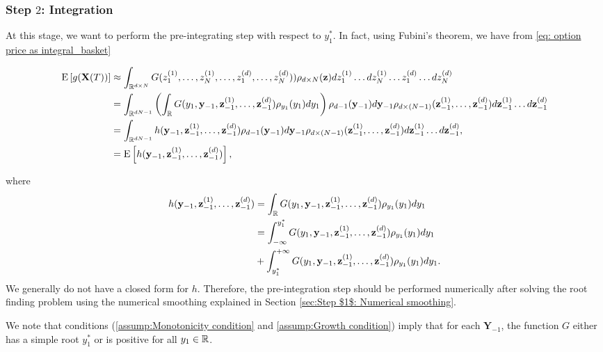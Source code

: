 \subsubsection{Step $2$: Integration}\label{sec:Step $2$: Integration}
At this stage, we want to perform the pre-integrating step with respect to  $y^\ast_1$. In fact, using Fubini's theorem, we have from \eqref{eq: option price as integral_basket}
\begin{small}
\begin{align}\label{eq: pre_integration_step_wrt_y1_basket}
	\mathrm{E}\left[g(\mathbf{X}(T))\right]&\approx\int_{\mathbb{R}^{d \times N}} G(z_1^{(1)}, \dots, z_N^{(1)}, \dots, z_1^{(d)},\dots,z^{(d)}_N)) \rho_{d \times N}(\mathbf{z}) dz_1^{(1)} \dots dz_N^{(1)} \dots z_1^{(d)} \dots dz^{(d)}_N \nonumber\\ 
	&=\int_{\mathbb{R}^{dN-1}} \left(\int_{\mathbb{R}} G(y_1,\mathbf{y}_{-1},\mathbf{z}^{(1)}_{-1},\dots,\mathbf{z}^{(d)}_{-1} ) \rho_{y_1}(y_1) dy_1 \right)\rho_{d-1}(\mathbf{y}_{-1}) d\mathbf{y}_{-1} \rho_{d \times(N-1)}(\mathbf{z}_{-1}^{(1)},\dots,\mathbf{z}_{-1}^{(d)}) d\mathbf{z}_{-1}^{(1)}\dots d\mathbf{z}_{-1}^{(d)} \nonumber\\	
	&=\int_{\mathbb{R}^{dN-1}} h(\mathbf{y}_{-1},\mathbf{z}^{(1)}_{-1},\dots,\mathbf{z}^{(d)}_{-1} )\rho_{d-1}(\mathbf{y}_{-1}) d\mathbf{y}_{-1}  \rho_{d\times (N-1)}(\mathbf{z}_{-1}^{(1)},\dots,\mathbf{z}_{-1}^{(d)}) d\mathbf{z}^{(1)}_{-1} \dots d\mathbf{z}^{(d)}_{-1}, \\ \nonumber
	&=\mathrm{E}\left[h(\mathbf{y}_{-1}, \mathbf{z}^{(1)}_{-1},\dots,\mathbf{z}^{(d)}_{-1} )\right] ,
\end{align}
\end{small}
where
\begin{align}\label{eq:smooth_function_after_pre_integration}
 h(\mathbf{y}_{-1},\mathbf{z}^{(1)}_{-1},\dots,\mathbf{z}^{(d)}_{-1})&=\int_{\mathbb{R}} G(y_1,\mathbf{y}_{-1},\mathbf{z}^{(1)}_{-1},\dots,\mathbf{z}^{(d)}_{-1} ) \rho_{y_1}(y_1) dy_1 \nonumber\\
 &= \int_{-\infty}^{y^\ast_1} G(y_1,\mathbf{y}_{-1},\mathbf{z}^{(1)}_{-1},\dots,\mathbf{z}^{(d)}_{-1} ) \rho_{y_1}(y_1) dy_1\nonumber\\
 &+ \int_{y_1^\ast}^{+\infty} G(y_1,\mathbf{y}_{-1},\mathbf{z}^{(1)}_{-1},\dots,\mathbf{z}^{(d)}_{-1} ) \rho_{y_1}(y_1) dy_1 .
\end{align}
We generally do not have a closed form for $h$. Therefore, the pre-integration step should be performed numerically after solving the root finding problem using the numerical smoothing explained in Section \ref{sec:Step $1$: Numerical smoothing}.


\begin{remark}
We note that  conditions (\eqref{assump:Monotonicity condition} and \eqref{assump:Growth condition}) imply that for each $\mathbf{Y}_{-1}$, the function $G$ either has a simple  root $y_1^\ast$ or is positive for all $y_1 \in \mathbb{R}$.
\end{remark}

